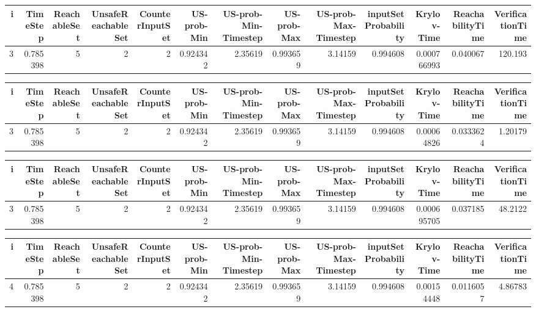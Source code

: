 \begin{tabular}{rrrrrrrrrrrrr}
\hline
   i &   TimeStep &   ReachableSet &   UnsafeReachableSet &   CounterInputSet &   US-prob-Min &   US-prob-Min-Timestep &   US-prob-Max &   US-prob-Max-Timestep &   inputSet Probability &   Krylov-Time &   ReachabilityTime &   VerificationTime \\
\hline
   3 &   0.785398 &              5 &                    2 &                 2 &      0.924342 &                2.35619 &      0.993659 &                3.14159 &               0.994608 &   0.000766993 &           0.040067 &            120.193 \\
\hline
\end{tabular}
\begin{tabular}{rrrrrrrrrrrrr}
\hline
   i &   TimeStep &   ReachableSet &   UnsafeReachableSet &   CounterInputSet &   US-prob-Min &   US-prob-Min-Timestep &   US-prob-Max &   US-prob-Max-Timestep &   inputSet Probability &   Krylov-Time &   ReachabilityTime &   VerificationTime \\
\hline
   3 &   0.785398 &              5 &                    2 &                 2 &      0.924342 &                2.35619 &      0.993659 &                3.14159 &               0.994608 &    0.00064826 &          0.0333624 &            1.20179 \\
\hline
\end{tabular}
\begin{tabular}{rrrrrrrrrrrrr}
\hline
   i &   TimeStep &   ReachableSet &   UnsafeReachableSet &   CounterInputSet &   US-prob-Min &   US-prob-Min-Timestep &   US-prob-Max &   US-prob-Max-Timestep &   inputSet Probability &   Krylov-Time &   ReachabilityTime &   VerificationTime \\
\hline
   3 &   0.785398 &              5 &                    2 &                 2 &      0.924342 &                2.35619 &      0.993659 &                3.14159 &               0.994608 &   0.000695705 &           0.037185 &            48.2122 \\
\hline
\end{tabular}
\begin{tabular}{rrrrrrrrrrrrr}
\hline
   i &   TimeStep &   ReachableSet &   UnsafeReachableSet &   CounterInputSet &   US-prob-Min &   US-prob-Min-Timestep &   US-prob-Max &   US-prob-Max-Timestep &   inputSet Probability &   Krylov-Time &   ReachabilityTime &   VerificationTime \\
\hline
   4 &   0.785398 &              5 &                    2 &                 2 &      0.924342 &                2.35619 &      0.993659 &                3.14159 &               0.994608 &    0.00154448 &          0.0116057 &            4.86783 \\
\hline
\end{tabular}
